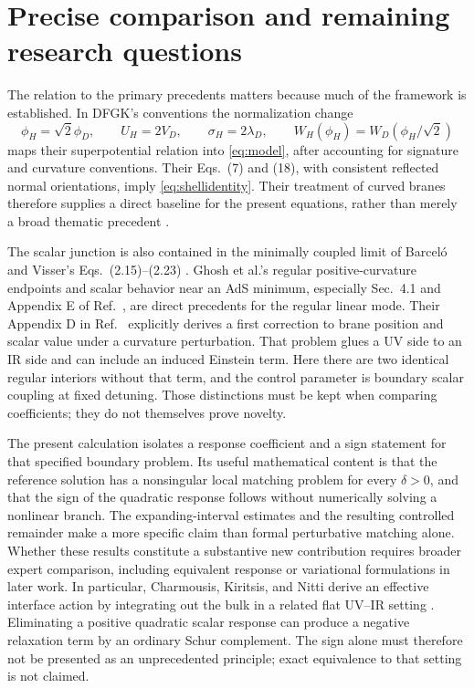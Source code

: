 \documentclass[11pt]{article}
\begin{document}
\section{Precise comparison and remaining research questions}
The relation to the primary precedents matters because much of the framework is established. In DFGK's conventions the normalization change
\begin{equation}
\phi_H=\sqrt{2}\phi_D,\qquad U_H=2V_D,\qquad
\sigma_H=2\lambda_D,\qquad
W_H(\phi_H)=W_D(\phi_H/\sqrt{2})
\end{equation}
maps their superpotential relation into \eqref{eq:model}, after accounting for signature and curvature conventions. Their Eqs.~(7) and (18), with consistent reflected normal orientations, imply \eqref{eq:shellidentity}. Their treatment of curved branes therefore supplies a direct baseline for the present equations, rather than merely a broad thematic precedent \cite{dfgk}.

The scalar junction is also contained in the minimally coupled limit of Barcel\'o and Visser's Eqs.~(2.15)--(2.23) \cite{bv}. Ghosh et al.'s regular positive-curvature endpoints and scalar behavior near an AdS minimum, especially Sec.~4.1 and Appendix E of Ref.~\cite{curvedflows}, are direct precedents for the regular linear mode. Their Appendix D in Ref.~\cite{curvedbranes} explicitly derives a first correction to brane position and scalar value under a curvature perturbation. That problem glues a UV side to an IR side and can include an induced Einstein term. Here there are two identical regular interiors without that term, and the control parameter is boundary scalar coupling at fixed detuning. Those distinctions must be kept when comparing coefficients; they do not themselves prove novelty.

The present calculation isolates a response coefficient and a sign statement for that specified boundary problem. Its useful mathematical content is that the reference solution has a nonsingular local matching problem for every $\delta>0$, and that the sign of the quadratic response follows without numerically solving a nonlinear branch. The expanding-interval estimates and the resulting controlled remainder make a more specific claim than formal perturbative matching alone. Whether these results constitute a substantive new contribution requires broader expert comparison, including equivalent response or variational formulations in later work. In particular, Charmousis, Kiritsis, and Nitti derive an effective interface action by integrating out the bulk in a related flat UV--IR setting \cite{selftuning}. Eliminating a positive quadratic scalar response can produce a negative relaxation term by an ordinary Schur complement. The sign alone must therefore not be presented as an unprecedented principle; exact equivalence to that setting is not claimed.
\end{document}
